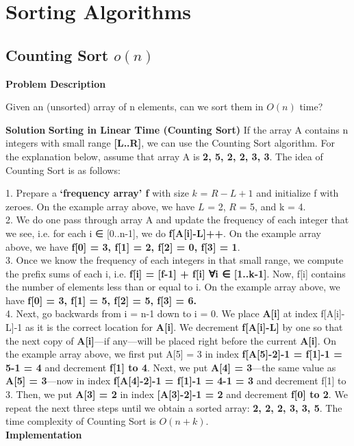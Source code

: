 \chapter{Sorting Algorithms}

\section{Counting Sort $o(n)$}
\textbf{{\Large{Problem Description}}}

Given an (unsorted) array of n elements, can we sort them in $O(n)$ time?\newline
    
\textbf{{\Large{Solution}}}\newline\newline
\textbf{{\large{Sorting in Linear Time (Counting Sort)}}}\newline\newline
If the array A contains n integers with small range \textbf{[L..R]}, we can use the Counting Sort algorithm. For the explanation
below, assume that array A is \textbf{{2, 5, 2, 2, 3, 3}}. The idea of Counting Sort is as follows:

1. Prepare a \textbf{‘frequency array’ f} with size $k$ = $R-L+1$ and initialize f with zeroes.
On the example array above, we have $L$ = 2, $R$ = 5, and k = 4.
\newline
\\
2. We do one pass through array A and update the frequency of each integer that we see,
i.e. for each i ∈ [0..n-1], we do \textbf{f[A[i]-L]++}.
On the example array above, we have \textbf{f[0] = 3, f[1] = 2, f[2] = 0, f[3] = 1}.
\newline
\\
3. Once we know the frequency of each integers in that small range,
we compute the prefix sums of each i, i.e. \textbf{f[i] = [f-1] + f[i] ∀i ∈ [1..k-1]}.
Now, f[i] contains the number of elements less than or equal to i.
On the example array above, we have \textbf{f[0] = 3, f[1] = 5, f[2] = 5, f[3] = 6.}
\newline
\\
4. Next, go backwards from i = n-1 down to i = 0.
We place \textbf{A[i]} at index f[A[i]-L]-1 as it is the correct location for \textbf{A[i]}. We decrement \textbf{f[A[i]-L]} by one so that the next copy of \textbf{A[i]}—if any—will be placed right before the current \textbf{A[i]}. On the example array above, we first put A[5] = 3 in index \textbf{f[A[5]-2]-1 = f[1]-1 = 5-1 = 4} and decrement \textbf{f[1] to 4}. Next, we put \textbf{A[4] = 3}—the same value as \textbf{A[5] = 3}—now in index \textbf{f[A[4]-2]-1 = f[1]-1 = 4-1 = 3} and decrement f[1] to 3. Then, we put \textbf{A[3] = 2} in index \textbf{[A[3]-2]-1 = 2} and decrement \textbf{f[0] to 2}. We repeat the next three steps until we obtain a sorted array: \textbf{{2, 2, 2, 3, 3, 5}}. The time complexity of Counting Sort is $O(n+k)$.
\newline
\\
\textbf{{\Large{Implementation}}}

